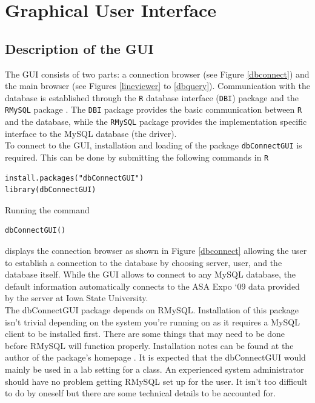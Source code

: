 \documentclass[11pt]{tise_style}
\begin{document}
\section{{Graphical User Interface}}

\subsection{Description of the GUI}

The GUI consists of two parts: a connection browser (see Figure \ref{dbconnect}) and the main
browser (see Figures \ref{lineviewer}  to \ref{dbquery}). Communication with the database is established through the {\tt R} database interface ({\tt DBI}) package \citep{dbi} and the {\tt RMySQL} package \citep{rmysql}. The  {\tt DBI}  package provides the basic  communication between {\tt R} and the database, while the {\tt RMySQL} package provides the implementation specific interface to the MySQL database (the driver).\\
To connect to the GUI, installation and loading of the package {\tt dbConnectGUI} is required. This can be done by submitting the following commands in {\tt R}
\vspace{-0.5cm}
\begin{verbatim}
install.packages("dbConnectGUI")
library(dbConnectGUI)
\end{verbatim} \vspace{-0.5cm}

Running the command \vspace{-0.5cm}
\begin{verbatim}
dbConnectGUI()
\end{verbatim} \vspace{-0.5cm}

displays the connection browser as shown in Figure  \ref{dbconnect} allowing the user to establish a connection to the database by choosing server, user, and the database itself. While the GUI allows to connect to any MySQL database, the default information automatically connects to the ASA Expo `09 data provided by the server at Iowa State University. \\[.25cm]

The dbConnectGUI package depends on RMySQL.  Installation of this package isn't trivial depending on the system you're running on as it requires a MySQL client to be installed first.  There are some things that may need to be done before RMySQL will function properly.  Installation notes can be found at the author of the package's homepage \citep{rmysql}.  It is expected that the dbConnectGUI would mainly be used in a lab setting for a class. An experienced system administrator should have no problem getting RMySQL set up for the user.  It isn't too difficult to do by oneself but there are some technical details to be accounted for.
\end{document}
